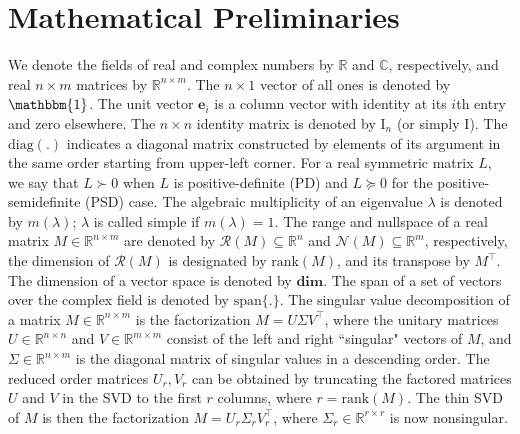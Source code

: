 \documentclass[journal]{IEEEtran}
\theoremstyle{definition}
\theoremstyle{remark}
\newcommand \e{{\bm e}}
\begin{document}
\section{Mathematical Preliminaries}
\label{sec:math}
    We denote the fields of real and complex numbers by $\mathbb{R}$ and $\mathbb{C}$, respectively, and real $n\times m$ matrices by $\mathbb{R}^{n \times m}$.
	The $n \times 1$ vector of all ones is denoted by $\mathbbm{1}$.
	The unit vector $\e_i$ is a column vector with identity at its $i$th entry and zero elsewhere.
	The $n \times n$ identity matrix is denoted by $\mathrm{I}_n$ (or simply $\mathrm{I}$).
	The $\mathrm{diag}(.)$ indicates a diagonal matrix constructed by elements of its argument in the same order starting from upper-left corner.
	For a real symmetric matrix $L$, we say that $L\succ 0$ when $L$ is positive-definite (PD) and $L\succeq 0$ for the 
 	positive-semidefinite (PSD) case.
    The {algebraic multiplicity} of an eigenvalue $\lambda$ is denoted by $m(\lambda)$;
$\lambda$ is called {simple} if $m(\lambda)=1$.
	The range and nullspace of a real matrix $M \in \mathbb{R}^{n \times m}$ are denoted by $\mathcal{R}(M) \subseteq \mathbb{R}^n$ and $\mathcal{N}(M)\subseteq \mathbb{R}^m$, respectively, the dimension of $\mathcal{R}(M)$ is designated by $\mathrm{rank} (M)$, and its transpose by $M^\intercal$.
	The dimension of a vector space is denoted by $\textbf{dim}$. 
	The span of a set of vectors over the complex field is denoted by
	$\mathrm{span}\{.\}$.
	The singular value decomposition of a matrix $M \in \mathbb{R}^{n\times m}$ is the factorization $M= {U} \Sigma {V}^\intercal$, where the unitary matrices ${U}\in \mathbb{R}^{n\times n}$ and ${V}\in \mathbb{R}^{m\times m}$ consist of the left and right ``singular" vectors of $M$, and $\Sigma \in \mathbb{R}^{n\times m}$ is the diagonal matrix of singular values in a descending order.
	The reduced order matrices $U_r,V_r$ can be obtained by truncating the factored matrices $U$ and $V$ in the SVD to the first $r$ columns, where $r = \mathrm{rank}(M)$. The thin SVD of $M$ is then the factorization $M = U_r \Sigma_r V_r^\intercal$, where $\Sigma_r \in \mathbb{R}^{r \times r}$ is now nonsingular.
\end{document}
